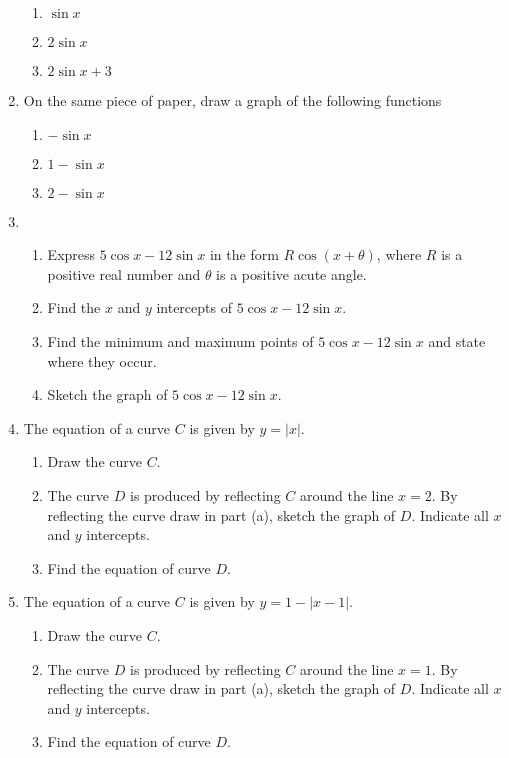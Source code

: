 \documentclass[letterpaper]{article}
\begin{document}
\begin{enumerate}
\begin{enumerate}
\item $\sin x$
\item $2 \sin x$
\item $2 \sin x + 3$
\end{enumerate}

\item On the same piece of paper, draw a graph of the following functions

\begin{enumerate}
\item $-\sin x$
\item $1-\sin x$
\item $2-\sin x$
\end{enumerate}

\item 
\begin{enumerate}
\item Express $5 \cos x - 12 \sin x$ in the form $R \cos (x + \theta)$, where $R$ is a positive real number and $\theta$ is a positive acute angle.
\item Find the $x$ and $y$ intercepts of $5 \cos x - 12 \sin x$.
\item Find the minimum and maximum points of $5 \cos x - 12 \sin x$ and state where they occur.
\item Sketch the graph of $5 \cos x - 12 \sin x$.
\end{enumerate}

\item The equation of a curve $C$ is given by $y = |x|$. 

\begin{enumerate}
\item Draw the curve $C$.
\item The curve $D$ is produced by reflecting $C$ around the line $x = 2$. By reflecting the curve draw in part (a), sketch the graph of $D$. Indicate all $x$ and $y$ intercepts.
\item Find the equation of curve $D$.
\end{enumerate}

\item The equation of a curve $C$ is given by $y = 1 - |x - 1|$. 

\begin{enumerate}
\item Draw the curve $C$.
\item The curve $D$ is produced by reflecting $C$ around the line $x = 1$. By reflecting the curve draw in part (a), sketch the graph of $D$. Indicate all $x$ and $y$ intercepts.
\item Find the equation of curve $D$.
\end{enumerate}

\end{enumerate}
\end{document}
